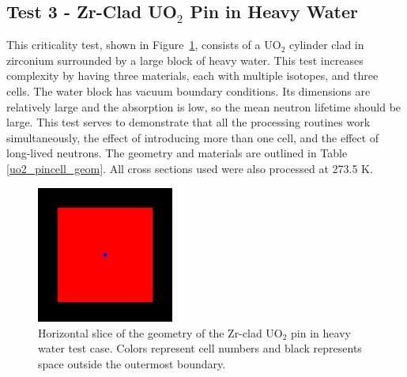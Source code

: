 \documentclass[preprint,12pt]{elsarticle}
\begin{document}
\newpage
\subsection{Test 3 - Zr-Clad UO$_2$ Pin in Heavy Water}

This criticality test, shown in Figure~\ref{pincell_geom_pic}, consists of a UO$_2$ cylinder clad in zirconium surrounded by a large block of heavy water.  This test increases complexity by having three materials, each with multiple isotopes, and three cells.  The water block has vacuum boundary conditions.  Its dimensions are relatively large and the absorption is low, so the mean neutron lifetime should be large.  This test serves to demonstrate that all the processing routines work simultaneously,
 the effect of introducing more than one cell, and the effect of long-lived neutrons.  The geometry and materials are outlined in Table \ref{uo2_pincell_geom}.  All cross sections used were also processed at 273.5 K.

\begin{figure}[h!] 
  \centering
    \includegraphics[width=0.4\textwidth]{graphics/pincell-xy.png}
     \caption{  Horizontal slice of the geometry of the Zr-clad UO$_2$ pin in heavy water test case.  Colors represent cell numbers and black represents space outside the outermost boundary. \label{pincell_geom_pic} }
\end{figure}
\end{document}
